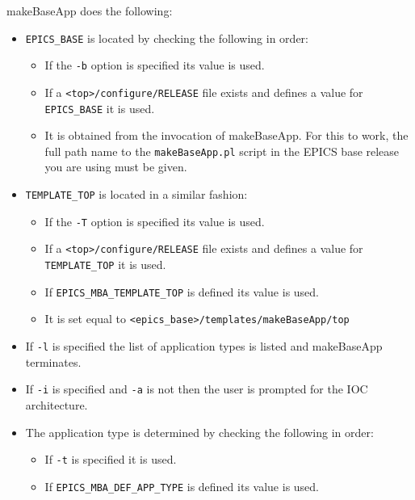 makeBaseApp does the following:

\begin{itemize}
\item \verb|EPICS_BASE| is located by checking the following in order:

\begin{itemize}
\item If the \verb|-b| option is specified its value is used.

\item If a \verb|<top>/configure/RELEASE| file exists and defines a value for \verb|EPICS_BASE| it is used.

\item It is obtained from the invocation of makeBaseApp.
For this to work, the full path name to the \verb|makeBaseApp.pl| script in the EPICS base release you are using must be given.
\end{itemize}

\item \verb|TEMPLATE_TOP| is located in a similar fashion:

\begin{itemize}
\item If the \verb|-T| option is specified its value is used.

\item If a \verb|<top>/configure/RELEASE| file exists and defines a value for \verb|TEMPLATE_TOP| it is used.

\item If \verb|EPICS_MBA_TEMPLATE_TOP| is defined its value is used.

\item It is set equal to \verb|<epics_base>/templates/makeBaseApp/top|
\end{itemize}

\item If \verb|-l| is specified the list of application types is listed and makeBaseApp terminates.

\item If \verb|-i| is specified and \verb|-a| is not then the user is prompted for the IOC architecture.

\item The application type is determined by checking the following in order:

\begin{itemize}
\item If \verb|-t| is specified it is used.

\item If \verb|EPICS_MBA_DEF_APP_TYPE| is defined its value is used.


\end{itemize}
\end{itemize}
